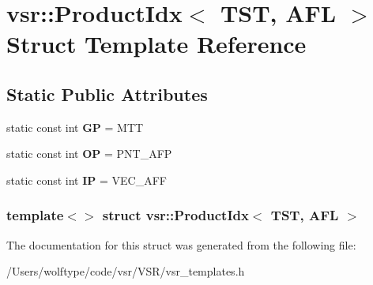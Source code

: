 \hypertarget{structvsr_1_1_product_idx_3_01_t_s_t_00_01_a_f_l_01_4}{\section{vsr\-:\-:Product\-Idx$<$ T\-S\-T, A\-F\-L $>$ Struct Template Reference}
\label{structvsr_1_1_product_idx_3_01_t_s_t_00_01_a_f_l_01_4}
}
\subsection*{Static Public Attributes}
\begin{DoxyCompactItemize}
\item 
\hypertarget{structvsr_1_1_product_idx_3_01_t_s_t_00_01_a_f_l_01_4_ae4cc898baa5de87d6553afef44e6b9ab}{static const int {\bfseries G\-P} = M\-T\-T}\label{structvsr_1_1_product_idx_3_01_t_s_t_00_01_a_f_l_01_4_ae4cc898baa5de87d6553afef44e6b9ab}

\item 
\hypertarget{structvsr_1_1_product_idx_3_01_t_s_t_00_01_a_f_l_01_4_a5d307fc175e65ebba3778e9476a6349c}{static const int {\bfseries O\-P} = P\-N\-T\-\_\-\-A\-F\-P}\label{structvsr_1_1_product_idx_3_01_t_s_t_00_01_a_f_l_01_4_a5d307fc175e65ebba3778e9476a6349c}

\item 
\hypertarget{structvsr_1_1_product_idx_3_01_t_s_t_00_01_a_f_l_01_4_a4afb2bbf8273efc8d4d2f2aff2bde845}{static const int {\bfseries I\-P} = V\-E\-C\-\_\-\-A\-F\-F}\label{structvsr_1_1_product_idx_3_01_t_s_t_00_01_a_f_l_01_4_a4afb2bbf8273efc8d4d2f2aff2bde845}

\end{DoxyCompactItemize}
\subsubsection*{template$<$$>$ struct vsr\-::\-Product\-Idx$<$ T\-S\-T, A\-F\-L $>$}



The documentation for this struct was generated from the following file\-:\begin{DoxyCompactItemize}
\item 
/\-Users/wolftype/code/vsr/\-V\-S\-R/vsr\-\_\-templates.\-h\end{DoxyCompactItemize}
